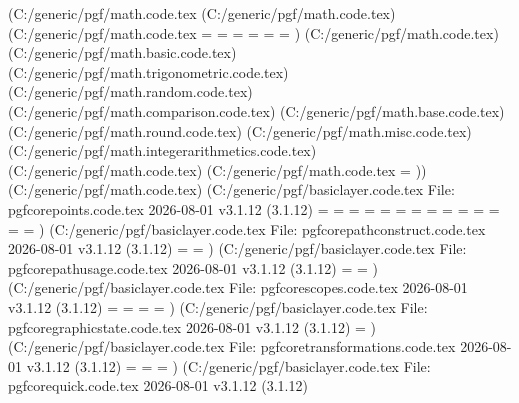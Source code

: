 (C:\MikTeX\tex/generic/pgf/math\pgfmath.code.tex
(C:\MikTeX\tex/generic/pgf/math\pgfmathutil.code.tex)
(C:\MikTeX\tex/generic/pgf/math\pgfmathparser.code.tex
\pgfmath@dimen=
\pgfmath@count=
\pgfmath@box=
\pgfmath@toks=
\pgfmath@stack@operand=
\pgfmath@stack@operation=
)
(C:\MikTeX\tex/generic/pgf/math\pgfmathfunctions.code.tex)
(C:\MikTeX\tex/generic/pgf/math\pgfmathfunctions.basic.code.tex)
(C:\MikTeX\tex/generic/pgf/math\pgfmathfunctions.trigonometric.code.tex)
(C:\MikTeX\tex/generic/pgf/math\pgfmathfunctions.random.code.tex)
(C:\MikTeX\tex/generic/pgf/math\pgfmathfunctions.comparison.code.tex)
(C:\MikTeX\tex/generic/pgf/math\pgfmathfunctions.base.code.tex)
(C:\MikTeX\tex/generic/pgf/math\pgfmathfunctions.round.code.tex)
(C:\MikTeX\tex/generic/pgf/math\pgfmathfunctions.misc.code.tex)
(C:\MikTeX\tex/generic/pgf/math\pgfmathfunctions.integerarithmetics.code.tex)
(C:\MikTeX\tex/generic/pgf/math\pgfmathcalc.code.tex)
(C:\MikTeX\tex/generic/pgf/math\pgfmathfloat.code.tex
\c@pgfmathroundto@lastzeros=
))
(C:\MikTeX\tex/generic/pgf/math\pgfint.code.tex)
(C:\MikTeX\tex/generic/pgf/basiclayer\pgfcorepoints.code.tex
File: pgfcorepoints.code.tex 2026-08-01 v3.1.12 (3.1.12)
\pgf@picminx=
\pgf@picmaxx=
\pgf@picminy=
\pgf@picmaxy=
\pgf@pathminx=
\pgf@pathmaxx=
\pgf@pathminy=
\pgf@pathmaxy=
\pgf@xx=
\pgf@xy=
\pgf@yx=
\pgf@yy=
\pgf@zx=
\pgf@zy=
)
(C:\MikTeX\tex/generic/pgf/basiclayer\pgfcorepathconstruct.code.tex
File: pgfcorepathconstruct.code.tex 2026-08-01 v3.1.12 (3.1.12)
\pgf@path@lastx=
\pgf@path@lasty=
)
(C:\MikTeX\tex/generic/pgf/basiclayer\pgfcorepathusage.code.tex
File: pgfcorepathusage.code.tex 2026-08-01 v3.1.12 (3.1.12)
\pgf@shorten@end@additional=
\pgf@shorten@start@additional=
)
(C:\MikTeX\tex/generic/pgf/basiclayer\pgfcorescopes.code.tex
File: pgfcorescopes.code.tex 2026-08-01 v3.1.12 (3.1.12)
\pgfpic=
\pgf@hbox=
\pgf@layerbox@main=
\pgf@picture@serial@count=
)
(C:\MikTeX\tex/generic/pgf/basiclayer\pgfcoregraphicstate.code.tex
File: pgfcoregraphicstate.code.tex 2026-08-01 v3.1.12 (3.1.12)
\pgflinewidth=
)
(C:\MikTeX\tex/generic/pgf/basiclayer\pgfcoretransformations.code.tex
File: pgfcoretransformations.code.tex 2026-08-01 v3.1.12 (3.1.12)
\pgf@pt@x=
\pgf@pt@y=
\pgf@pt@temp=
)
(C:\MikTeX\tex/generic/pgf/basiclayer\pgfcorequick.code.tex
File: pgfcorequick.code.tex 2026-08-01 v3.1.12 (3.1.12)
